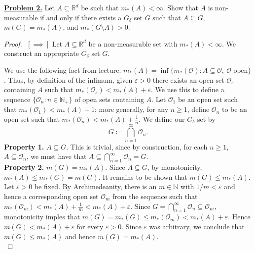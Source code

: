 \noindent \underline{\textbf{Problem 2.}} Let \( A \subseteq \mathbb{R}^{d} 	 \) be such that \( m_*(A) < \infty \). Show that \( A \) is non-measurable if and only if there exists a \( G_\delta  \) set \( G \) such that \( A \subseteq G \), \( m(G) = m_*(A)  \), and \( m_*(G \setminus A) > 0. \) 
\begin{proof}$ $\newline
	\( [\implies ] \) Let \( A \subseteq \mathbb{R}^{d}  \) be a non-measurable set with \( m_*(A) < \infty \). We construct an appropriate \( G_\delta  \) set \( G \). 

	We use the following fact from lecture: \( m_*(A) = \inf \{ m_*(\mathcal{O}) : A \subseteq \mathcal{O}, \  \mathcal{O} \mbox{ open}  \}  \). Thus, by definition of the infimum, given \( \varepsilon > 0 \) there exists an open set \( \mathcal{O}_\varepsilon  \) containing \( A \) such that \( m_*(\mathcal{O} _\varepsilon ) < m_*(A) + \varepsilon .  \) We use this to define a sequence \( \{ \mathcal{O}_{n}  : n \in \mathbb{N}_+ \}  \) of open sets containing \( A \). Let \( \mathcal{O}_{1}  \) be an open set such that \( m_*(\mathcal{O}_{1} ) < m_*(A) + 1 \); more generally, for any \( n \geq 1 \), define \( \mathcal{O}_{n}  \) to be an open set such that \( m_*(\mathcal{O}_{n} ) < m_*(A) + \frac{1}{n}  \). We define our \( G_\delta  \) set by \[G \coloneqq \bigcap_{n=1}^{\infty} \mathcal{O}_{n}. \]
\noindent \textbf{Property 1.} \emph{\(A \subseteq G\)}. This is trivial, since by construction, for each \( n \geq 1 \), \( A \subseteq \mathcal{O}_{n}  \), we must have that \( A \subseteq \bigcap_{n=1}^{\infty} \mathcal{O}_{n} = G. \) \\

\noindent \textbf{Property 2.} \( m(G) = m_*(A)  \). Since \( A \subseteq G \), by monotonicity, \( m_*(A) \leq m_*(G) = m(G). \) It remains to be shown that \( m(G) \leq m_*(A). \) Let \( \varepsilon >0 \) be fixed. By Archimedeanity, there is an \( m \in \mathbb{N}  \) with \( 1/m < \varepsilon \) and hence a corresponding open set \( \mathcal{O}_{m}  \) from the sequence such that \( m_*(\mathcal{O}_{m} ) < m_*(A) + \frac{1}{m} < m_*(A) + \varepsilon   \). Since \( G = \bigcap_{n=1}^{\infty} \mathcal{O}_{n} \subseteq \mathcal{O}_{m} \), monotonicity imples that \( m(G) = m_*(G) \leq m_*(\mathcal{O}_{m}  ) < m_*(A) +  \varepsilon  \). Hence \( m(G) < m_*(A) + \varepsilon  \) for every \( \varepsilon > 0 \). Since \( \varepsilon  \) was arbitrary, we conclude that \( m(G) \leq m_*(A)  \) and hence \( m(G) = m_*(A)  \). \\


\end{proof}
